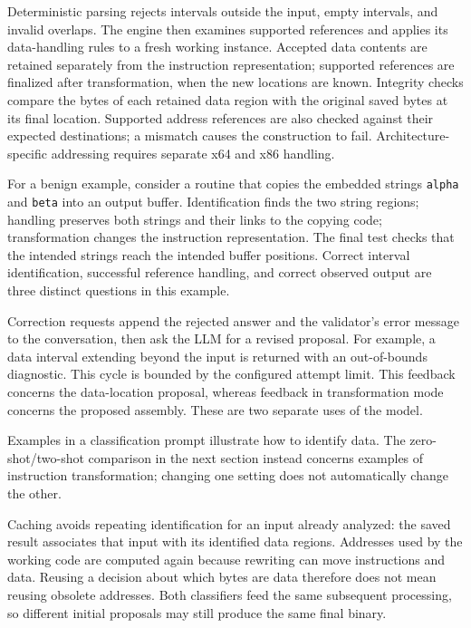 Deterministic parsing rejects intervals outside the input, empty intervals,
and invalid overlaps. The engine then examines supported references and
applies its data-handling rules to a fresh working instance. Accepted data
contents are retained separately from the instruction representation;
supported references are finalized after transformation, when the new
locations are known. Integrity checks compare the bytes of each retained
data region with the original saved bytes at its final location. Supported
address references are also checked against their expected destinations;
a mismatch causes the construction to fail.
Architecture-specific addressing requires separate x64 and x86 handling.

For a benign example, consider a routine that copies the embedded strings
\texttt{alpha} and \texttt{beta} into an output buffer. Identification finds
the two string regions; handling preserves both strings and their links
to the copying code; transformation changes the instruction representation.
The final test checks that the intended strings reach the intended buffer
positions. Correct interval identification, successful reference handling,
and correct observed output are three distinct questions in this example.

Correction requests append the rejected answer and the validator's error
message to the conversation, then ask the LLM for a revised proposal.
For example, a data interval extending beyond the input is returned with
an out-of-bounds diagnostic. This cycle is bounded by the configured
attempt limit. This feedback concerns the
data-location proposal, whereas feedback in transformation mode concerns
the proposed assembly. These are two separate uses of the model.

Examples in a classification prompt illustrate how to identify data.
The zero-shot/two-shot comparison in the next section instead concerns
examples of instruction transformation; changing one setting does not
automatically change the other.

Caching avoids repeating identification for an input already analyzed:
the saved result associates that input with its identified data regions.
Addresses used by the working code are computed again because rewriting
can move instructions and data. Reusing a decision about which bytes are
data therefore does not mean reusing obsolete addresses. Both classifiers
feed the same subsequent processing, so different initial proposals may
still produce the same final binary.
